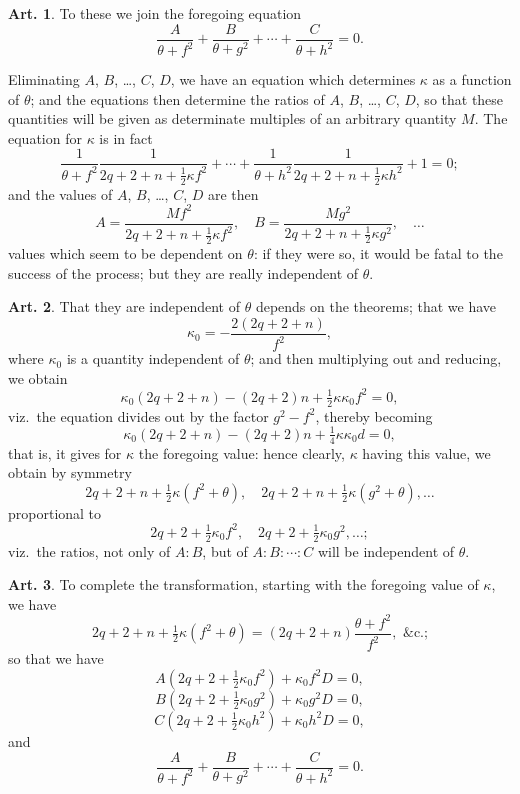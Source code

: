\documentclass[12pt,a4paper]{article}
\theoremstyle{definition}
\newtheorem{art}{Art.}[section]
\begin{document}
\begin{art}\label{art:119}
To these we join the foregoing equation
\[
\frac{A}{\theta+f^2} + \frac{B}{\theta+g^2} + \cdots + \frac{C}{\theta+h^2} = 0.
\]

Eliminating $A$, $B$, \ldots, $C$, $D$, we have an equation which determines $\kappa$ as a function of $\theta$; and the equations then determine the ratios of $A$, $B$, \ldots, $C$, $D$, so that these quantities will be given as determinate multiples of an arbitrary quantity $M$. The equation for $\kappa$ is in fact
\[
\frac{1}{\theta+f^2}\frac{1}{2q+2+n+\tfrac{1}{2}\kappa f^2} + \cdots + \frac{1}{\theta+h^2}\frac{1}{2q+2+n+\tfrac{1}{2}\kappa h^2} + 1 = 0;
\]
and the values of $A$, $B$, \ldots, $C$, $D$ are then
\[
A = \frac{Mf^2}{2q+2+n+\tfrac{1}{2}\kappa f^2}, \quad B = \frac{Mg^2}{2q+2+n+\tfrac{1}{2}\kappa g^2}, \quad \ldots
\]
values which seem to be dependent on $\theta$: if they were so, it would be fatal to the success of the process; but they are really independent of $\theta$.
\end{art}

\begin{art}\label{art:120}
That they are independent of $\theta$ depends on the theorems; that we have
\[
\kappa_0 = -\frac{2(2q+2+n)}{f^2},
\]
where $\kappa_0$ is a quantity independent of $\theta$; and then multiplying out and reducing, we obtain
\[
\kappa_0(2q+2+n) - (2q+2)n + \tfrac{1}{2}\kappa\kappa_0 f^2 = 0,
\]
viz.\ the equation divides out by the factor $g^2 - f^2$, thereby becoming
\[
\kappa_0(2q+2+n) - (2q+2)n + \tfrac{1}{4}\kappa\kappa_0 d = 0,
\]
that is, it gives for $\kappa$ the foregoing value: hence clearly, $\kappa$ having this value, we obtain by symmetry
\[
2q+2+n+\tfrac{1}{2}\kappa(f^2+\theta), \quad 2q+2+n+\tfrac{1}{2}\kappa(g^2+\theta), \ldots
\]
proportional to
\[
2q+2+\tfrac{1}{2}\kappa_0 f^2, \quad 2q+2+\tfrac{1}{2}\kappa_0 g^2, \ldots;
\]
viz.\ the ratios, not only of $A:B$, but of $A:B:\cdots:C$ will be independent of $\theta$.
\end{art}

\begin{art}\label{art:121}
To complete the transformation, starting with the foregoing value of $\kappa$, we have
\[
2q+2+n+\tfrac{1}{2}\kappa(f^2+\theta) = (2q+2+n)\frac{\theta+f^2}{f^2}, \text{ \&c.;}
\]
so that we have
\[
A(2q+2+\tfrac{1}{2}\kappa_0 f^2) + \kappa_0 f^2 D = 0,
\]
\[
B(2q+2+\tfrac{1}{2}\kappa_0 g^2) + \kappa_0 g^2 D = 0,
\]
\[
C(2q+2+\tfrac{1}{2}\kappa_0 h^2) + \kappa_0 h^2 D = 0,
\]
and
\[
\frac{A}{\theta+f^2} + \frac{B}{\theta+g^2} + \cdots + \frac{C}{\theta+h^2} = 0.
\]
\end{art}
\end{document}
